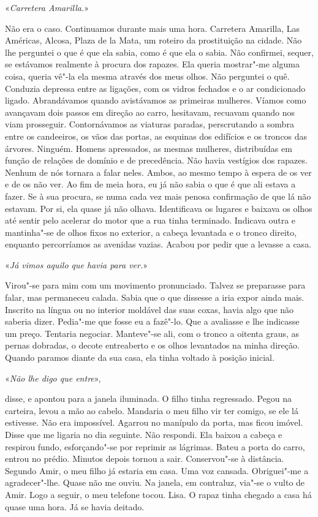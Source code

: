 «\emph{Carretera Amarilla.}»

Não era o caso. Continuamos durante mais uma hora. Carretera Amarilla,
Las Américas, Alcosa, Plaza de la Mata, um roteiro da prostituição na
cidade. Não lhe perguntei o que é que ela sabia, como é que ela o sabia.
Não confirmei, sequer, se estávamos realmente à procura dos rapazes. Ela
queria mostrar"-me alguma coisa, queria vê"-la ela mesma através dos
meus olhos. Não perguntei o quê. Conduzia depressa entre as ligações,
com os vidros fechados e o ar condicionado ligado. Abrandávamos quando
avistávamos as primeiras mulheres. Víamos como avançavam dois passos em
direção ao carro, hesitavam, recuavam quando nos viam prosseguir.
Contornávamos as viaturas paradas, perscrutando a sombra entre os
candeeiros, os vãos das portas, as esquinas dos edifícios e os troncos
das árvores. Ninguém. Homens apressados, as mesmas mulheres,
distribuídas em função de relações de domínio e de precedência. Não
havia vestígios dos rapazes. Nenhum de nós tornara a falar neles. Ambos,
ao mesmo tempo à espera de os ver e de os não ver. Ao fim de meia hora,
eu já não sabia o que é que ali estava a fazer. Se à sua procura, se
numa cada vez mais penosa confirmação de que lá não estavam. Por si, ela
quase já não olhava. Identificava os lugares e baixava os olhos até
sentir pelo acelerar do motor que a rua tinha terminado. Indicava outra
e mantinha"-se de olhos fixos no exterior, a cabeça levantada e o tronco
direito, enquanto percorríamos as avenidas vazias. Acabou por pedir que
a levasse a casa.

«\emph{Já vimos aquilo que havia para ver.}»

Virou"-se para mim com um movimento pronunciado. Talvez se preparasse
para falar, mas permaneceu calada. Sabia que o que dissesse a iria expor
ainda mais. Inscrito na língua ou no interior moldável das suas coxas,
havia algo que não saberia dizer. Pedia"-me que fosse eu a fazê"-lo. Que
a avaliasse e lhe indicasse um preço. Tentaria negociar. Manteve"-se
ali, com o tronco a oitenta graus, as pernas dobradas, o decote
entreaberto e os olhos levantados na minha direção. Quando paramos
diante da sua casa, ela tinha voltado à posição inicial.

«\emph{Não lhe digo que entre}»,

disse, e apontou para a janela iluminada. O filho tinha regressado.
Pegou na carteira, levou a mão ao cabelo. Mandaria o meu filho vir ter
comigo, se ele lá estivesse. Não era impossível. Agarrou no manípulo da
porta, mas ficou imóvel. Disse que me ligaria no dia seguinte. Não
respondi. Ela baixou a cabeça e respirou fundo, esforçando"-se por
reprimir as lágrimas. Bateu a porta do carro, entrou no prédio. Minutos
depois tornou a sair. Conservou"-se à distância. Segundo Amir, o meu
filho já estaria em casa. Uma voz cansada. Obriguei"-me a
agradecer"-lhe. Quase não me ouviu. Na janela, em contraluz, via"-se o
vulto de Amir. Logo a seguir, o meu telefone tocou. Lisa. O rapaz tinha
chegado a casa há quase uma hora. Já se havia deitado.

